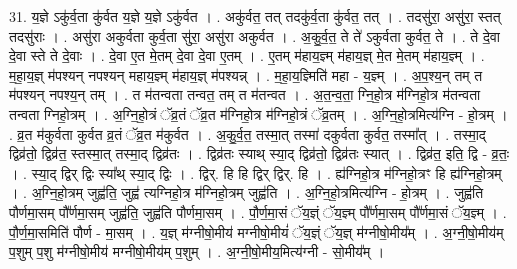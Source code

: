 \documentclass[17pt]{extarticle}
\begin{document}
31. य॒ज्ञे ऽकु॑र्व॒ता कु॑र्वत य॒ज्ञे य॒ज्ञे ऽकु॑र्वत । . अकु॑र्वत॒ तत् तदकु॑र्व॒ता कु॑र्वत॒ तत् । . तदसु॑रा॒ असु॑रा॒ स्तत् तदसु॑राः । . असु॑रा अकुर्वता कुर्व॒ता सु॑रा॒ असु॑रा अकुर्वत । . अ॒कु॒र्व॒त॒ ते ते॑ ऽकुर्वता कुर्वत॒ ते । . ते दे॒वा दे॒वा स्ते ते दे॒वाः । . दे॒वा ए॒त मे॒तम् दे॒वा दे॒वा ए॒तम् । . ए॒तम् म॑हाय॒ज्ञ्म् म॑हाय॒ज्ञ् मे॒त मे॒तम् म॑हाय॒ज्ञ्म् । . म॒हा॒य॒ज्ञ् म॑पश्यन् नपश्यन् महाय॒ज्ञ्म् म॑हाय॒ज्ञ् म॑पश्यन्न् । . म॒हा॒य॒ज्ञ्मिति॑ महा - य॒ज्ञ्म् । . अ॒प॒श्य॒न् तम् त म॑पश्यन् नपश्य॒न् तम् । . त म॑तन्वता तन्वत॒ तम् त म॑तन्वत । . अ॒त॒न्व॒ता॒ ग्नि॒हो॒त्र म॑ग्निहो॒त्र म॑तन्वता तन्वता ग्निहो॒त्रम् । . अ॒ग्नि॒हो॒त्रं ॅव्र॒तं ॅव्र॒त म॑ग्निहो॒त्र म॑ग्निहो॒त्रं ॅव्र॒तम् । . अ॒ग्नि॒हो॒त्रमित्य॑ग्नि - हो॒त्रम् । . व्र॒त म॑कुर्वता कुर्वत व्र॒तं ॅव्र॒त म॑कुर्वत । . अ॒कु॒र्व॒त॒ तस्मा॒त् तस्मा॑ दकुर्वता कुर्वत॒ तस्मा᳚त् । . तस्मा॒द् द्विव्र॑तो॒ द्विव्र॑त॒ स्तस्मा॒त् तस्मा॒द् द्विव्र॑तः । . द्विव्र॑तः स्याथ् स्या॒द् द्विव्र॑तो॒ द्विव्र॑तः स्यात् । . द्विव्र॑त॒ इति॒ द्वि - व्र॒तः॒ । . स्या॒द् द्विर् द्विः स्या᳚थ् स्या॒द् द्विः । . द्विर्. हि हि द्विर् द्विर्. हि । . ह्य॑ग्निहो॒त्र म॑ग्निहो॒त्रꣳ हि ह्य॑ग्निहो॒त्रम् । . अ॒ग्नि॒हो॒त्रम् जुह्व॑ति॒ जुह्व॑ त्यग्निहो॒त्र म॑ग्निहो॒त्रम् जुह्व॑ति । . अ॒ग्नि॒हो॒त्रमित्य॑ग्नि - हो॒त्रम् । . जुह्व॑ति पौर्णमा॒सम् पौ᳚र्णमा॒सम् जुह्व॑ति॒ जुह्व॑ति पौर्णमा॒सम् । . पौ॒र्ण॒मा॒सं ॅय॒ज्ञ्ं ॅय॒ज्ञ्म् पौ᳚र्णमा॒सम् पौ᳚र्णमा॒सं ॅय॒ज्ञ्म् । . पौ॒र्ण॒मा॒समिति॑ पौर्ण - मा॒सम् । . य॒ज्ञ् म॑ग्नीषो॒मीय॑ मग्नीषो॒मीयं॑ ॅय॒ज्ञ्ं ॅय॒ज्ञ् म॑ग्नीषो॒मीय᳚म् । . अ॒ग्नी॒षो॒मीय॑म् प॒शुम् प॒शु म॑ग्नीषो॒मीय॑ मग्नीषो॒मीय॑म् प॒शुम् । . अ॒ग्नी॒षो॒मीय॒मित्य॑ग्नी - सो॒मीय᳚म् । \newline
\end{document}
